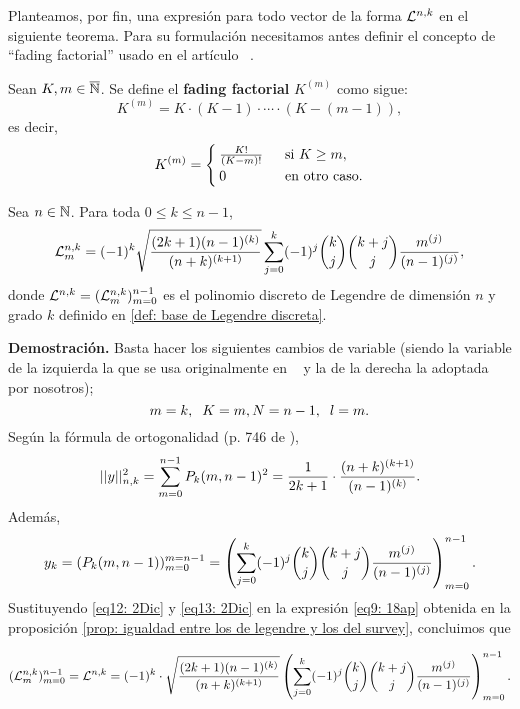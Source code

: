 Planteamos, por fin, una expresión para
todo vector de la forma
$\mathcal{L}^{n,k}$ en el siguiente teorema.
Para su formulación necesitamos antes
definir el concepto de ``fading factorial''
usado en el artículo ~\cite{Neuman}. 
\begin{defi}
\label{def: fading factorial}
Sean $K, m \in \overline{\mathbb{N}}$. Se define
el \textbf{fading factorial} $K^{(m)}$ como sigue:
\[
K^{(m)}= K \cdot (K-1) \cdot \cdots \cdot (K-(m-1)),
\]
es decir,\begin{align*}
K^{(m)}= \begin{cases}
\frac{K!}{(K-m)!} & \hspace{0.2cm} \text{si } K \geq m, \\
0 & \hspace{0.2cm} \text{en otro caso.} 
\end{cases}
\end{align*}
\end{defi}

\begin{teo}
\label{teo: expresión analítica de BON de Legendre}
Sea $n\in \mathbb{N}$. Para toda $0 \leq k \leq n-1$,
\begin{equation}
\label{eq0: 6En}
\mathcal{L}^{n,k}_{m}= (-1)^{k} \sqrt{\frac{(2k+1)(n-1)^{(k)}}{(n+k)^{(k+1)}}}
\sum\limits_{j=0}^{k}(-1)^{j}\binom{k}{j}\binom{k+j}{j}
\frac{m^{(j)}}{(n-1)^{(j)}},
\end{equation}
donde $\mathcal{L}^{n,k}=(\mathcal{L}_{m}^{n,k})_{m=0}^{n-1}$
es el polinomio discreto de Legendre de
dimensión $n$ y grado $k$ definido en 
\ref{def: base de Legendre discreta}.
\end{teo}  

\noindent
\textbf{Demostración.}
Basta hacer los siguientes cambios de variable
(siendo la variable de la izquierda la que se
usa originalmente en ~\cite{Neuman} y la de la 
derecha la adoptada por nosotros);
\[
m=k, \hspace{0.2cm} K=m,
N=n-1, \hspace{0.2cm} l=m.
\]
Según la fórmula de ortogonalidad
(p. 746 de \cite{Neuman}),
\begin{equation}
\label{eq12: 2Dic}
||y||_{n,k}^{2}= \sum\limits_{m=0}^{n-1}P_{k}(m, n-1)^{2}
= \frac{1}{2k+1} \cdot \frac{(n+k)^{(k+1)}}{(n-1)^{(k)}}.
\end{equation}
Además, 
\begin{equation}
\label{eq13: 2Dic}
y_{k}= (P_{k}(m, n-1))_{m=0}^{m=n-1}
= \left(
\sum\limits_{j=0}^{k}(-1)^{j}\binom{k}{j}\binom{k+j}{j}
\frac{m^{(j)}}{(n-1)^{(j)}}
\right)_{m=0}^{n-1}.
\end{equation}
Sustituyendo \eqref{eq12: 2Dic}
y \eqref{eq13: 2Dic} en la expresión
\eqref{eq9: 18ap} obtenida
en la proposición
\ref{prop: igualdad entre los de legendre y los del survey},
concluimos que

\[
(\mathcal{L}_{m}^{n,k})_{m=0}^{n-1}
= \mathcal{L}^{n,k}
= (-1)^{k} \cdot 
\sqrt{\frac{(2k+1)(n-1)^{(k)}}{(n+k)^{(k+1)}}}
\left(
\sum\limits_{j=0}^{k}(-1)^{j}\binom{k}{j}\binom{k+j}{j}
\frac{m^{(j)}}{(n-1)^{(j)}}
\right)_{m=0}^{n-1}.
\]


\QEDB 
\vspace{0.2cm}
